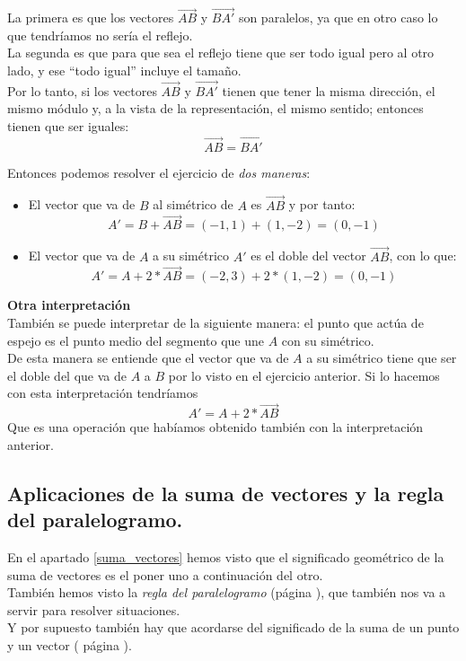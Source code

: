 \documentclass[a4paper,11pt,answers]{exam}
\begin{document}
\begin{questions}
\begin{solution}
    La primera es que los vectores $\overrightarrow{AB}$ y $\overrightarrow{BA'}$ son paralelos,
    ya que en otro caso lo que tendríamos no sería el reflejo.\\
    La segunda es que para que sea el reflejo tiene que ser todo igual pero al otro lado, y ese
    ``todo igual'' incluye el tamaño.\\
    Por lo tanto, si los vectores $\overrightarrow{AB}$ y $\overrightarrow{BA'}$ tienen que tener
    la misma dirección, el mismo módulo y, a la vista de la representación, el mismo sentido;
    entonces tienen que ser iguales:
    \[\overrightarrow{AB} = \overrightarrow{BA'}\]

    Entonces podemos resolver el ejercicio de \emph{dos maneras}:
    \begin{itemize}
    \item El vector que va de $B$ al simétrico de $A$ es $\overrightarrow{AB}$ y por tanto:
      \[A' = B + \overrightarrow{AB} = (-1,1) + (1,-2) = (0, -1)\]
    \item El vector que va de $A$ a su simétrico $A'$ es el doble del vector $\overrightarrow{AB}$,
      con lo que:
      \[A' = A + 2*\overrightarrow{AB} = (-2, 3) + 2*(1, -2) = (0, -1)\]
    \end{itemize}

    \textbf{Otra interpretación}\\
    También se puede interpretar de la siguiente manera: el punto que actúa de espejo es el
    punto medio del segmento que une $A$ con su simétrico.\\
    De esta manera se entiende que el vector que va de $A$ a su simétrico tiene que ser el
    doble del que va de $A$ a $B$ por lo visto en el ejercicio anterior.
    Si lo hacemos con esta interpretación tendríamos
    \[A' = A + 2*\overrightarrow{AB}\]
    Que es una operación que habíamos obtenido también con la interpretación anterior.
  \end{solution}
\end{questions}
\subsection{Aplicaciones de la suma de vectores y la regla del paralelogramo.}
En el apartado \ref{suma_vectores} hemos visto que el significado geométrico de la suma de
vectores es el poner uno a continuación del otro.\\
También hemos visto la \emph{regla del paralelogramo} (página \pageref{regla_paralelogramo}), que
también nos va a servir para resolver situaciones.\\
Y por supuesto también hay que acordarse del significado de la suma de un punto y un vector (
página \pageref{suma_punto_vector}).\\
\end{document}
